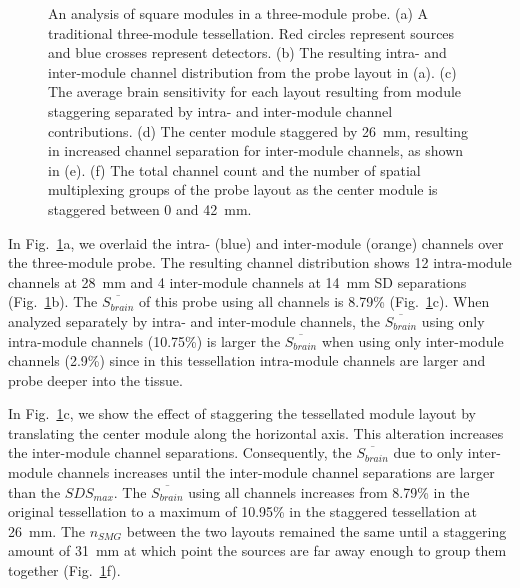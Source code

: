 \begin{figure}
\begin{center}
\end{center}
\caption {An analysis of square modules in a three-module probe. (a) A traditional three-module tessellation. Red circles represent sources and blue crosses represent detectors. (b) The resulting intra- and inter-module channel distribution from the probe layout in (a). (c) The average brain sensitivity for each layout resulting from module staggering separated by intra- and inter-module channel contributions. (d) The center module staggered by 26~mm, resulting in increased channel separation for inter-module channels, as shown in (e). (f) The total channel count and the number of spatial multiplexing groups of the probe layout as the center module is staggered between 0 and 42~mm.}
 \label{fig:stagger}
\end{figure} 

In Fig.~\ref{fig:stagger}a, we overlaid the intra- (blue) and inter-module (orange) channels over the three-module probe. The resulting channel distribution shows 12 intra-module channels at 28~mm and 4 inter-module channels at 14~mm SD separations (Fig.~\ref{fig:stagger}b). The $\overline{S_{brain}}$ of this probe using all channels is 8.79\% (Fig.~\ref{fig:stagger}c). When analyzed separately by intra- and inter-module channels, the $\overline{S_{brain}}$ using only intra-module channels (10.75\%) is larger the $\overline{S_{brain}}$ when using only inter-module channels (2.9\%) since in this tessellation intra-module channels are larger and probe deeper into the tissue.  

In Fig.~\ref{fig:stagger}c, we show the effect of staggering the tessellated module layout by translating the center module along the horizontal axis. This alteration increases the inter-module channel separations. Consequently, the $\overline{S_{brain}}$ due to only inter-module channels increases until the inter-module channel separations are larger than the $SDS_{max}$. The $\overline{S_{brain}}$ using all channels increases from 8.79\% in the original tessellation to a maximum of 10.95\% in the staggered tessellation at 26~mm. The $n_{SMG}$ between the two layouts remained the same until a staggering amount of 31~mm at which point the sources are far away enough to group them together (Fig.~\ref{fig:stagger}f). 
